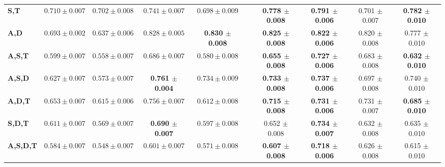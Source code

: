 \begin{table}[!htbp]
\begin{adjustbox}{angle=90}
\begin{tabular}{l|c|c|c|c|c|c|c|c|c|}
		\textbf{S,T} & $0.710 \pm 0.007$ & $0.702 \pm 0.008$ & $0.741 \pm 0.007$ & $0.698 \pm 0.009$ & & \textbf{0.778 $\pm$ 0.008} & \textbf{0.791 $\pm$ 0.006} & 0.701 $\pm$ 0.007 & \textbf{0.782 $\pm$ 0.010} \\
		\textbf{A,D} & $0.693 \pm 0.002$ & $0.637 \pm 0.006$ & $0.828 \pm 0.005$ & \textbf{0.830 $\pm$ 0.008} & & \textbf{0.825 $\pm$ 0.008} & \textbf{0.822 $\pm$ 0.006} & 0.820 $\pm$ 0.008 & 0.777 $\pm$ 0.010 \\ \hline
		\textbf{A,S,T} & $0.599 \pm 0.007$ & $0.558 \pm 0.007$ & $0.686 \pm 0.007$ & $0.580 \pm 0.008$ & & \textbf{0.655 $\pm$ 0.008} & \textbf{0.727 $\pm$ 0.006} & 0.683 $\pm$ 0.008 & \textbf{0.632 $\pm$ 0.010} \\
		\textbf{A,S,D} & $0.627 \pm 0.007$ & $0.573 \pm 0.007$ & \textbf{0.761 $\pm$ 0.004} & $0.734 \pm 0.009$ & & \textbf{0.733 $\pm$ 0.008} & \textbf{0.737 $\pm$ 0.006} & 0.697 $\pm$ 0.008 & 0.740 $\pm$ 0.010 \\
		\textbf{A,D,T} & $0.653 \pm 0.007$ & $0.615 \pm 0.006$ & $0.756 \pm 0.007$ & $0.612 \pm 0.008$ & & \textbf{0.715 $\pm$ 0.008} & \textbf{0.731 $\pm$ 0.006} & 0.731 $\pm$ 0.007 & \textbf{0.685 $\pm$ 0.010} \\
		\textbf{S,D,T} & $0.611 \pm 0.007$ & $0.569 \pm 0.007$ & \textbf{0.690 $\pm$ 0.007} & $0.597 \pm 0.008$ & & 0.652 $\pm$ 0.008 & \textbf{0.734 $\pm$ 0.007} & 0.632 $\pm$ 0.008 & 0.635 $\pm$ 0.010 \\ \hline
		\textbf{A,S,D,T} & $0.584 \pm 0.007$ & $0.548 \pm 0.007$ & $0.601 \pm 0.007$ & $0.571 \pm 0.008$ & & \textbf{0.607 $\pm$ 0.008} & \textbf{0.718 $\pm$ 0.006} & 0.626 $\pm$ 0.008 & 0.615 $\pm$ 0.010 \\
	\end{tabular}
	\end{adjustbox}
\end{table}


